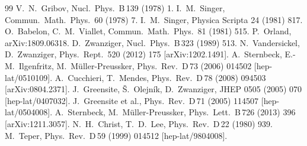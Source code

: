 \documentclass[11pt]{article}
\begin{document}
\begin{thebibliography}{99}
 V.~N.~Gribov, Nucl.\ Phys.\ B\,139 (1978) 1.
 I.~M.~Singer, Commun.\ Math.\ Phys.\ 60 (1978) 7.
 I.~M.~Singer, Physica Scripta 24 (1981) 817.
 O.~Babelon, C.~M.~Viallet, Commun.\ Math.\ Phys.\ 81 (1981) 515.
 P.~Orland, arXiv:1809.06318.
 D.~Zwanziger, Nucl.\ Phys.\ B\,323 (1989) 513.
 N.~Vandersickel, D.~Zwanziger, Phys.\ Rept.\ 520 (2012) 175 [arXiv:1202.1491].
 A.~Sternbeck, E.-M.~Ilgenfritz, M.~M\"uller-Preussker, Phys.\ Rev.\ D\,73 (2006) 014502 [hep-lat/0510109].
 A.~Cucchieri, T.~Mendes, Phys.\ Rev.\ D\,78 (2008) 094503 [arXiv:0804.2371].
 J.~Greensite, \v S.~Olejn\'ik, D.~Zwanziger, JHEP 0505 (2005) 070 [hep-lat/0407032].
 J.~Greensite et al., Phys.\ Rev.\ D\,71 (2005) 114507 [hep-lat/0504008].
 A.~Sternbeck, M.~M\"uller-Preussker, Phys.\ Lett.\ B\,726 (2013) 396 [arXiv:1211.3057].
 N.~H.~Christ, T.~D.~Lee, Phys.\ Rev.\ D\,22 (1980) 939.
 M.~Teper, Phys.\ Rev.\ D\,59 (1999) 014512 [hep-lat/9804008].
\end{thebibliography}
\end{document}
